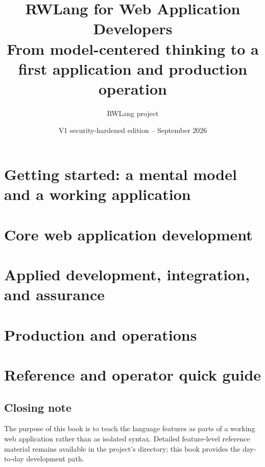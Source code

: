 \documentclass[11pt,a4paper,openany]{book}
\title{\textbf{RWLang for Web Application Developers}\\\large From model-centered thinking to a first application and production operation}
\author{RWLang project}
\date{V1 security-hardened edition -- September 2026}
\begin{document}
\frontmatter
\maketitle

\tableofcontents
\mainmatter
\part{Getting started: a mental model and a working application}




\part{Core web application development}









\part{Applied development, integration, and assurance}





\part{Production and operations}





\part{Reference and operator quick guide}



\appendix

\backmatter
\chapter*{Closing note}
The purpose of this book is to teach the language features as parts of a working web application rather than as isolated syntax. Detailed feature-level reference material remains available in the project's  directory; this book provides the day-to-day development path.
\end{document}
